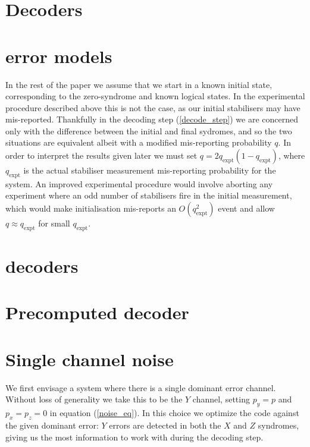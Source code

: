 \section{Decoders}




\section{error models}

In the rest of the paper we assume that we start in a known initial state, corresponding to the zero-syndrome and known logical states. In the experimental procedure described above this is not the case, as our initial stabilisers may have mis-reported. Thankfully in the decoding step (\ref{decode_step}) we are concerned only with the difference between the initial and final sydromes, and so the two situations are equivalent albeit with a modified mis-reporting probability $q$. In order to interpret the results given later we must set $q = 2q_\text{expt}(1-q_\text{expt})$, where $q_\text{expt}$ is the actual stabiliser measurement mis-reporting probability for the system. An improved experimental procedure would involve aborting any experiment where an odd number of stabilisers fire in the initial measurement, which would make initialisation mis-reports an $O(q_\text{expt}^2)$ event and allow $q \approx q_\text{expt}$ for small $q_\text{expt}$.

\section{decoders}
\section{Precomputed decoder}

\section{Single channel noise}

We first envisage a system where there is a single dominant error channel. Without loss of generality we take this to be the $Y$ channel, setting $p_y = p$ and $p_x = p_z = 0$ in equation (\ref{noise_eq}). In this choice we optimize the code against the given dominant error: $Y$ errors are detected in both the $X$ and $Z$ syndromes, giving us the most information to work with during the decoding step.

